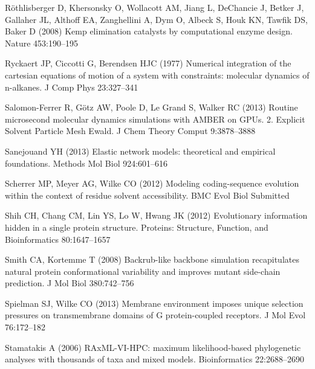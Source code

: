 \documentclass[smallextended]{svjour3}
\begin{document}
\begin{thebibliography}{55}
R\"o{}thlisberger D, Khersonsky O, Wollacott AM, Jiang L, DeChancie J, Betker
  J, Gallaher JL, Althoff EA, Zanghellini A, Dym O, Albeck S, Houk KN, Tawfik
  DS, Baker D (2008) Kemp elimination catalysts by computational enzyme design.
  Nature 453:190--195

Ryckaert JP, Ciccotti G, Berendsen HJC (1977) Numerical integration of the
  cartesian equations of motion of a system with constraints: molecular
  dynamics of n-alkanes. J Comp Phys 23:327--341

Salomon-Ferrer R, G\"otz AW, Poole D, {Le Grand} S, Walker RC (2013) Routine
  microsecond molecular dynamics simulations with {AMBER} on {GPUs.} 2.
  {Explicit Solvent Particle Mesh Ewald}. J Chem Theory Comput 9:3878--3888

Sanejouand YH (2013) Elastic network models: theoretical and empirical
  foundations. Methods Mol Biol 924:601--616

Scherrer MP, Meyer AG, Wilke CO (2012) Modeling coding-sequence evolution
  within the context of residue solvent accessibility. BMC Evol Biol Submitted

Shih CH, Chang CM, Lin YS, Lo W, Hwang JK (2012) Evolutionary information
  hidden in a single protein structure. Proteins: Structure, Function, and
  Bioinformatics 80:1647--1657

Smith CA, Kortemme T (2008) Backrub-like backbone simulation recapitulates
  natural protein conformational variability and improves mutant side-chain
  prediction. J Mol Biol 380:742--756

Spielman SJ, Wilke CO (2013) Membrane environment imposes unique selection
  pressures on transmembrane domains of {G} protein-coupled receptors. J Mol
  Evol 76:172--182

Stamatakis A (2006) {RAxML-VI-HPC:} maximum likelihood-based phylogenetic
  analyses with thousands of taxa and mixed models. Bioinformatics
  22:2688--2690


\end{thebibliography}
\end{document}
